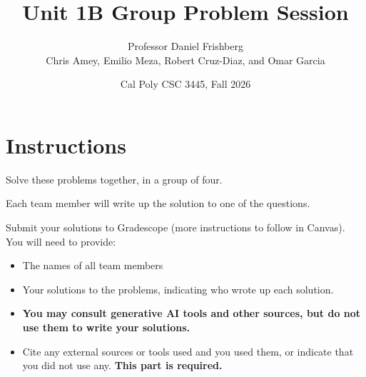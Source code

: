 \documentclass{article}
\title{Unit 1B Group Problem Session}
\author{Professor Daniel Frishberg \\  Chris Amey, Emilio Meza, Robert Cruz-Diaz, and Omar Garcia}
\date{Cal Poly CSC 3445, Fall 2026}
\theoremstyle{definition}
\begin{document}
\lstset{upquote=true}
\setlength\parindent{0em}

\maketitle

\section{Instructions}
Solve these problems together, in a group of four.

Each team member will write up the solution to one of the questions.

Submit your solutions to Gradescope (more instructions to follow in Canvas). You will need to provide:

\begin{itemize}
    \item The names of all team members
    \item Your solutions to the problems, indicating who wrote up each solution.
    \item \textbf{You may consult generative AI tools and other sources, but do not use them to write your solutions.}
    \item Cite any external sources or tools used and you used them, or indicate that you did not use any. \textbf{This part is required.}
\end{itemize}

\pagebreak
\end{document}
